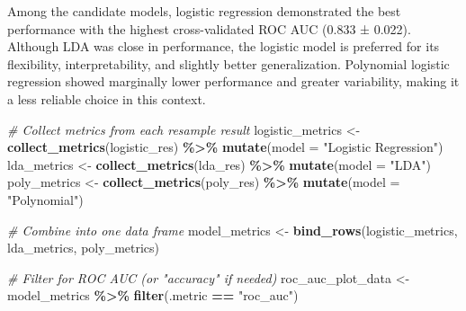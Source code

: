 \documentclass[
]{article}
\newenvironment{Shaded}{\begin{snugshade}}{\end{snugshade}}
\newcommand{\AttributeTok}[1]{\textcolor[rgb]{0.13,0.29,0.53}{#1}}
\newcommand{\CommentTok}[1]{\textcolor[rgb]{0.56,0.35,0.01}{\textit{#1}}}
\newcommand{\FunctionTok}[1]{\textcolor[rgb]{0.13,0.29,0.53}{\textbf{#1}}}
\newcommand{\NormalTok}[1]{#1}
\newcommand{\OtherTok}[1]{\textcolor[rgb]{0.56,0.35,0.01}{#1}}
\newcommand{\SpecialCharTok}[1]{\textcolor[rgb]{0.81,0.36,0.00}{\textbf{#1}}}
\newcommand{\StringTok}[1]{\textcolor[rgb]{0.31,0.60,0.02}{#1}}
\begin{document}
Among the candidate models, logistic regression demonstrated the best
performance with the highest cross-validated ROC AUC (0.833 ± 0.022).
Although LDA was close in performance, the logistic model is preferred
for its flexibility, interpretability, and slightly better
generalization. Polynomial logistic regression showed marginally lower
performance and greater variability, making it a less reliable choice in
this context.

\begin{Shaded}
\begin{Highlighting}[]
\CommentTok{\# Collect metrics from each resample result}
\NormalTok{logistic\_metrics }\OtherTok{\textless{}{-}} \FunctionTok{collect\_metrics}\NormalTok{(logistic\_res) }\SpecialCharTok{\%\textgreater{}\%} \FunctionTok{mutate}\NormalTok{(}\AttributeTok{model =} \StringTok{"Logistic Regression"}\NormalTok{)}
\NormalTok{lda\_metrics }\OtherTok{\textless{}{-}} \FunctionTok{collect\_metrics}\NormalTok{(lda\_res) }\SpecialCharTok{\%\textgreater{}\%} \FunctionTok{mutate}\NormalTok{(}\AttributeTok{model =} \StringTok{"LDA"}\NormalTok{)}
\NormalTok{poly\_metrics }\OtherTok{\textless{}{-}} \FunctionTok{collect\_metrics}\NormalTok{(poly\_res) }\SpecialCharTok{\%\textgreater{}\%} \FunctionTok{mutate}\NormalTok{(}\AttributeTok{model =} \StringTok{"Polynomial"}\NormalTok{)}

\CommentTok{\# Combine into one data frame}
\NormalTok{model\_metrics }\OtherTok{\textless{}{-}} \FunctionTok{bind\_rows}\NormalTok{(logistic\_metrics, lda\_metrics, poly\_metrics)}

\CommentTok{\# Filter for ROC AUC (or "accuracy" if needed)}
\NormalTok{roc\_auc\_plot\_data }\OtherTok{\textless{}{-}}\NormalTok{ model\_metrics }\SpecialCharTok{\%\textgreater{}\%} \FunctionTok{filter}\NormalTok{(.metric }\SpecialCharTok{==} \StringTok{"roc\_auc"}\NormalTok{)}


\end{Highlighting}
\end{Shaded}
\end{document}

